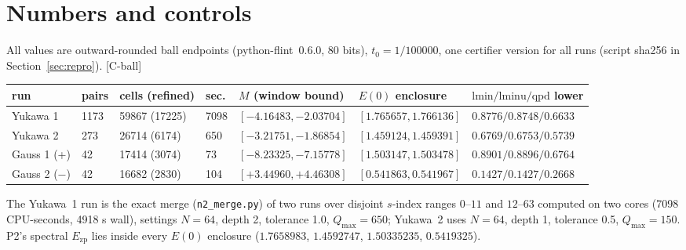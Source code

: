 \documentclass[10pt]{article}
\newcommand{\tCb}{\textcolor{blue!60!black}{\textsf{[C-ball]}}}
\newcommand{\Ezp}{E_{\mathrm{zp}}}
\begin{document}
\section{Numbers and controls}\label{sec:numbers}
All values are outward-rounded ball endpoints (python-flint~0.6.0, 80 bits), $t_0=1/100000$, one certifier version for all runs (script sha256 in Section~\ref{sec:repro}). \tCb
\begin{center}\footnotesize\setlength{\tabcolsep}{1.5pt}\begin{tabular}{p{1.8cm}p{1.0cm}p{2.0cm}p{0.9cm}p{3.1cm}p{3.1cm}p{2.7cm}}\toprule
run & pairs & cells (refined) & sec. & $M$ (window bound) & $E(0)$ enclosure & $\mathrm{lmin}/\mathrm{lminu}/\mathrm{qpd}$ lower\\\midrule
Yukawa 1 & 1173 & 59867 (17225) & 7098 & $[-4.16483,-2.03704]$ & $[1.765657,1.766136]$ & $0.8776/0.8748/0.6633$\\
Yukawa 2 & 273 & 26714 (6174) & 650 & $[-3.21751,-1.86854]$ & $[1.459124,1.459391]$ & $0.6769/0.6753/0.5739$\\
Gauss 1 (+) & 42 & 17414 (3074) & 73 & $[-8.23325,-7.15778]$ & $[1.503147,1.503478]$ & $0.8901/0.8896/0.6764$\\
Gauss 2 ($-$) & 42 & 16682 (2830) & 104 & $[+3.44960,+4.46308]$ & $[0.541863,0.541967]$ & $0.1427/0.1427/0.2668$\\
\bottomrule\end{tabular}\end{center}
The Yukawa~1 run is the exact merge (\texttt{n2\_merge.py}) of two runs over disjoint $s$-index ranges $0$--$11$ and $12$--$63$ computed on two cores (7098 CPU-seconds, 4918 s wall), settings $N=64$, depth 2, tolerance 1.0, $Q_{\max}=650$; Yukawa~2 uses $N=64$, depth 1, tolerance 0.5, $Q_{\max}=150$. P2's spectral $\Ezp$ lies inside every $E(0)$ enclosure ($1.7658983$, $1.4592747$, $1.50335235$, $0.5419325$).
\end{document}
